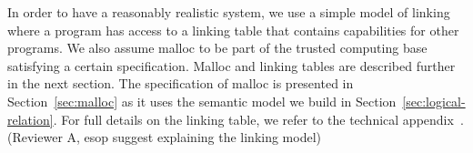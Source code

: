 \documentclass[format=acmsmall, review=true, screen=true]{acmart}
\renewcommand{\sectionname}{Section}
\newcommand{\itoplas}[1]{#1}
\newcommand{\itoplassug}[1]{}
\begin{document}

In order to have a reasonably realistic system, we use a simple model of linking
where a program has access to a linking table that contains capabilities for
other programs. We also assume malloc to be part of the trusted computing base
satisfying a certain specification. Malloc and linking tables are described
further in the next section.
\itoplas{The specification of malloc is presented in \sectionname~\ref{sec:malloc} as it uses the semantic model we build in Section~\ref{sec:logical-relation}.
For full details on the linking table, we refer to the technical
appendix~\citep{technical_appendix}.} \itoplas{(Reviewer A, esop suggest explaining the
  linking model)\\}
\itoplassug{Suggestion: We also have the flag table used
  for assertions, maybe we should add a description of it here.\\}
\end{document}
